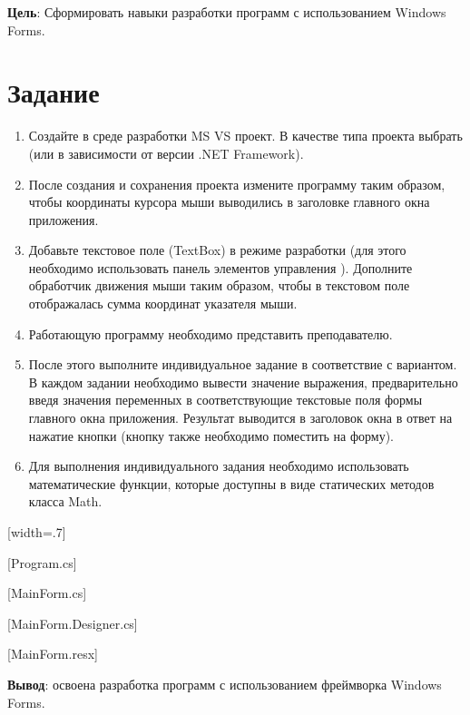 \documentclass{bsuir}
\begin{document}
\maketitle
\mainmatter
\renewcommand{\thefigure}{\arabic{figure}}
\renewcommand{\thelisting}{\arabic{listing}}

\textbf{Цель}: Сформировать навыки разработки программ с использованием Windows
Forms.

\section*{Задание}

\begin{enumerate}
    \item Создайте в среде разработки MS VS проект. В качестве типа проекта
          выбрать  (или  в зависимости от версии .NET Framework).
    \item После создания и сохранения проекта измените программу таким образом,
          чтобы координаты курсора мыши выводились в заголовке главного окна
          приложения.
    \item Добавьте текстовое поле (TextBox) в режиме разработки (для этого
          необходимо использовать панель элементов управления
          ). Дополните обработчик движения мыши таким
          образом, чтобы в текстовом поле отображалась сумма координат указателя
          мыши.
    \item Работающую программу необходимо представить преподавателю.
    \item После этого выполните индивидуальное задание в соответствие с
          вариантом. В каждом задании необходимо вывести значение выражения,
          предварительно введя значения переменных в соответствующие текстовые
          поля формы главного окна приложения. Результат выводится в заголовок
          окна в ответ на нажатие кнопки (кнопку также необходимо поместить на
          форму).
    \item Для выполнения индивидуального задания необходимо использовать
          математические функции, которые доступны в виде статических методов
          класса Math.
\end{enumerate}

[width=.7\textwidth]

[Program.cs]

[MainForm.cs]

[MainForm.Designer.cs]

[MainForm.resx]

\textbf{Вывод}: освоена разработка программ с использованием фреймворка Windows
Forms.
\end{document}
